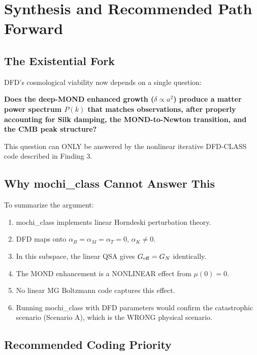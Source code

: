 \documentclass[11pt]{article}
\theoremstyle{definition}
\theoremstyle{remark}
\newcommand{\Geff}{G_{\rm eff}}
\begin{document}
\section{Synthesis and Recommended Path Forward}
\label{sec:synthesis}

\subsection{The Existential Fork}

DFD's cosmological viability now depends on a single question:

\begin{tcolorbox}[colback=yellow!10!white, colframe=yellow!60!black,
  title=\textbf{THE QUESTION}]
\textbf{Does the deep-MOND enhanced growth ($\delta \propto a^2$)
produce a matter power spectrum $P(k)$ that matches observations,
after properly accounting for Silk damping, the MOND-to-Newton
transition, and the CMB peak structure?}

This question can ONLY be answered by the nonlinear iterative
DFD-CLASS code described in Finding 3.
\end{tcolorbox}

\subsection{Why mochi\_class Cannot Answer This}

To summarize the argument:
\begin{enumerate}
\item mochi\_class implements linear Horndeski perturbation theory.
\item DFD maps onto $\alpha_B = \alpha_M = \alpha_T = 0$, $\alpha_K
  \neq 0$.
\item In this subspace, the linear QSA gives $\Geff = G_N$ identically.
\item The MOND enhancement is a NONLINEAR effect from $\mu(0) = 0$.
\item No linear MG Boltzmann code captures this effect.
\item Running mochi\_class with DFD parameters would confirm the
  catastrophic scenario (Scenario A), which is the WRONG physical
  scenario.
\end{enumerate}

\subsection{Recommended Coding Priority}
\end{document}
